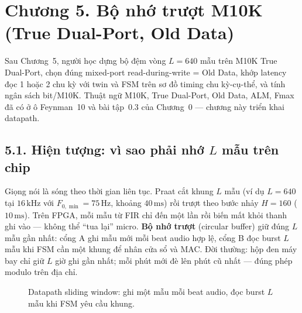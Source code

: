 \clearpage
{}
\section*{Chương 5. Bộ nhớ trượt M10K (True Dual-Port, Old Data)}

\begin{learningobj}
Sau Chương~5, người học dựng bộ đệm vòng $L=640$ mẫu trên M10K True Dual-Port, chọn đúng mixed-port read-during-write = Old Data, khớp latency đọc 1 hoặc 2 chu kỳ với twin và FSM trên sơ đồ timing chu kỳ-cụ-thể, và tính ngân sách bit/M10K. Thuật ngữ M10K, True Dual-Port, Old Data, ALM, Fmax đã có ở ô Feynman~10 và bài tập~0.3 của Chương~0 --- chương này triển khai datapath.
\end{learningobj}

\subsection*{5.1. Hiện tượng: vì sao phải nhớ $L$ mẫu trên chip}

\begin{physicalinsight}
Giọng nói là sóng theo thời gian liên tục. Praat cắt khung $L$ mẫu (ví dụ $L=640$ tại $16\,\text{kHz}$ với $F_{0,\min}=75\,\text{Hz}$, khoảng $40\,\text{ms}$) rồi trượt theo bước nhảy $H=160$ ($10\,\text{ms}$). Trên FPGA, mỗi mẫu từ FIR chỉ đến một lần rồi biến mất khỏi thanh ghi vào --- không thể ``tua lại'' micro. \textbf{Bộ nhớ trượt} (circular buffer) giữ đúng $L$ mẫu gần nhất: cổng A ghi mẫu mới mỗi beat audio hợp lệ, cổng B đọc burst $L$ mẫu khi FSM cần một khung để nhân cửa sổ và MAC. Đời thường: hộp đen máy bay chỉ giữ $L$ giờ ghi gần nhất; mỗi phút mới đè lên phút cũ nhất --- đúng phép modulo trên địa chỉ.
\end{physicalinsight}

\begin{figure}[H]
\centering
{}
\caption{Datapath sliding window: ghi một mẫu mỗi beat audio, đọc burst $L$ mẫu khi FSM yêu cầu khung.}
\label{fig:ch05_sliding_datapath}
\end{figure}

